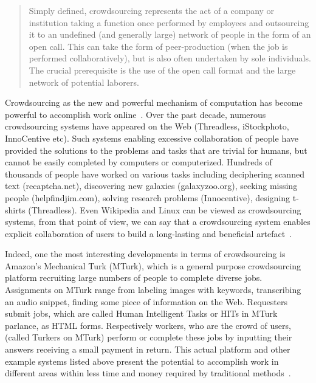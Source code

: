 \begin{quotation}
Simply defined, crowdsourcing represents the act of a company or institution taking 
a function once performed by employees and outsourcing it to an undefined 
(and generally large) network of people in the form of an open call. This can take 
the form of peer-production (when the job is performed collaboratively), but is also 
often undertaken by sole individuals. The crucial prerequisite is the use of the open 
call format and the large network of potential laborers.~\cite{Howe2006a}
\end{quotation}

Crowdsourcing as the new and powerful mechanism of computation has become 
powerful to accomplish work online~\cite{Kittur2011}. Over the past decade, numerous 
crowdsourcing systems have appeared on the Web (Threadless, iStockphoto, 
InnoCentive etc). Such systems enabling excessive collaboration of people have 
provided the solutions to the problems and tasks that are trivial for humans, but 
cannot be easily completed by computers or computerized. Hundreds of thousands 
of people have worked on various tasks including deciphering scanned text (recaptcha.net), 
discovering new galaxies (galaxyzoo.org), seeking missing people (helpfindjim.com), 
solving research problems (Innocentive), designing t-shirts (Threadless). Even 
Wikipedia and Linux can be viewed as crowdsourcing systems, from that point of view, 
we can say that a crowdsourcing system enables explicit collaboration of users to 
build a long-lasting and beneficial artefact~\cite{Doan2011}.

Indeed, one the most interesting developments in terms of crowdsourcing is 
Amazon's Mechanical Turk (MTurk), which is a general purpose crowdsourcing platform 
recruiting large numbers of people to complete diverse jobs. Assignments on MTurk 
range from labeling images with keywords, transcribing an audio snippet, finding some 
piece of information on the Web. Requesters submit jobs, which are called Human 
Intelligent Tasks or HITs in MTurk parlance, as HTML forms. Respectively workers, 
who are the crowd of users, (called Turkers on MTurk) perform or complete these 
jobs by inputting their answers receiving a small payment in return. This actual 
platform and other example systems listed above present the potential to accomplish 
work in different areas within less time and money required by traditional 
methods~\cite{Minder2012, Marcus2011}.


